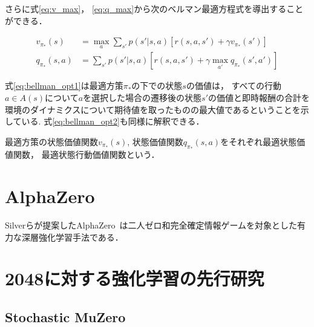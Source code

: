 さらに式\ref{eq:v_max}， \ref{eq:q_max}から次のベルマン最適方程式を導出することができる．

\begin{align}
  \label{eq:bellman_opt1}
  v_{\pi_*}(s) &= \max_a \sum_{s'}p(s'|s,a)[r(s,a,s') + \gamma v_{\pi_*}(s')] \\
  \label{eq:bellman_opt2}
  q_{\pi_*}(s,a) &= \sum_{s'}p(s'|s,a)[r(s,a,s') +\gamma \max_{a'}q_{\pi_*}(s',a')]
\end{align}

式\ref{eq:bellman_opt1}は最適方策$\pi_*$の下での状態$s$の価値は， すべての行動$a \in A(s)$について$a$を選択した場合の遷移後の状態$s'$の価値と即時報酬の合計を環境のダイナミクスについて期待値を取ったものの最大値であるということを示している.
式\ref{eq:bellman_opt2}も同様に解釈できる．

最適方策の状態価値関数$v_{\pi_*}(s)$, 状態価値関数$q_{\pi_*}(s,a)$をそれぞれ最適状態価値関数， 最適状態行動価値関数という．

\section{AlphaZero}
Silverらが提案したAlphaZero~\cite{AlphaZero}は二人ゼロ和完全確定情報ゲームを対象とした有力な深層強化学習手法である．

\section{2048に対する強化学習の先行研究}
\subsection{Stochastic MuZero}
